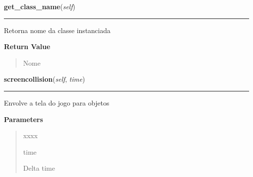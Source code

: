 \hspace{.8\funcindent}\begin{boxedminipage}{\funcwidth}

    \raggedright \textbf{get\_class\_name}(\textit{self})

    \vspace{-1.5ex}

    \rule{\textwidth}{0.5\fboxrule}
\setlength{\parskip}{2ex}
    Retorna nome da classe instanciada

\setlength{\parskip}{1ex}
      \textbf{Return Value}
    \vspace{-1ex}

      \begin{quote}
      Nome

      \end{quote}

    \end{boxedminipage}

    \label{pygame-asteroids:sprite_collision:SpriteCollision:screencollision}

    \vspace{0.5ex}

\hspace{.8\funcindent}\begin{boxedminipage}{\funcwidth}

    \raggedright \textbf{screencollision}(\textit{self}, \textit{time})

    \vspace{-1.5ex}

    \rule{\textwidth}{0.5\fboxrule}
\setlength{\parskip}{2ex}
    Envolve a tela do jogo para objetos

\setlength{\parskip}{1ex}
      \textbf{Parameters}
      \vspace{-1ex}

      \begin{quote}
        \begin{Ventry}{xxxx}

          \item[time]

          Delta time

        \end{Ventry}

      \end{quote}

    \end{boxedminipage}

